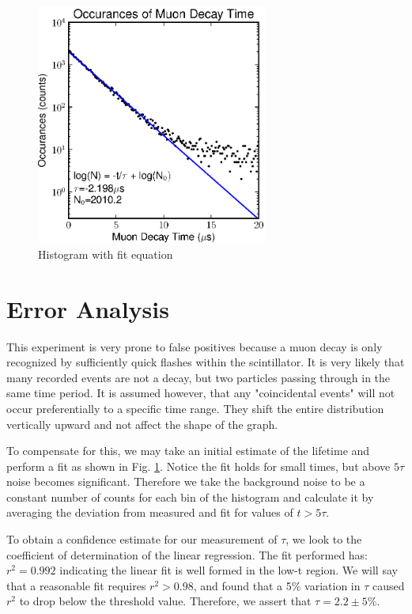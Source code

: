 \documentclass[12pt,twocolumn]{article}
\begin{document}
\begin{figure}[h!]
	\centering
	\label{fig:fit1}
	\includegraphics[width=3in]{images/fit1}
	\caption{Histogram with fit equation}
\end{figure}

\section{Error Analysis}

This experiment is very prone to false positives because a muon decay is only recognized by sufficiently quick
flashes within the scintillator. It is very likely that many recorded events are not a decay, but two particles
passing through in the same time period. It is assumed however, that any "coincidental events" will not occur
preferentially to a specific time range. They shift the entire distribution vertically upward and not affect the shape of
the graph.

To compensate for this, we may take an initial estimate of the lifetime and perform a fit as shown in Fig. \ref{fig:fit1}.
Notice the fit holds for small times, but above $5\tau$ noise becomes significant. Therefore we take the background noise to be
a constant number of counts for each bin of the histogram and calculate it by averaging the deviation from measured and fit
for values of $t>5\tau$.

To obtain a confidence estimate for our measurement of $\tau$, we look to the coefficient of determination of the linear
regression. The fit performed has: $r^{2}=0.992$ indicating the linear fit is well formed in the low-t region. We will say
that a reasonable fit requires $r^{2}>0.98$, and found that a 5\% variation in $\tau$ caused $r^{2}$ to drop below the 
threshold value. Therefore, we assert that $\tau=2.2\pm5\%$.

\nocite{*}


\end{document}
